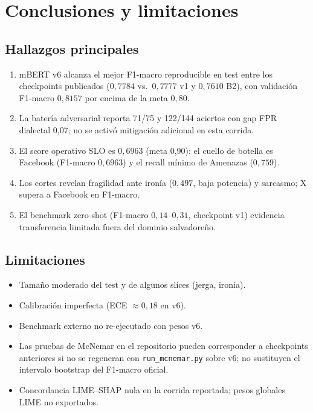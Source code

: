 \chapter{Conclusiones y limitaciones}
\label{ch:conclusiones}

\section{Hallazgos principales}

\begin{enumerate}[leftmargin=*]
  
  \item mBERT v6 alcanza el mejor F1-macro reproducible en test entre los
        checkpoints publicados ($0{,}7784$ vs.\ $0{,}7777$ v1 y $0{,}7610$ B2),
        con validación F1-macro $0{,}8157$ por encima de la meta $0{,}80$.
  \item La batería adversarial reporta 71/75 y 122/144 aciertos con gap FPR
        dialectal 0{,}07; no se activó mitigación adicional en esta corrida.
  \item El score operativo SLO es $0{,}6963$ (meta 0{,}90): el cuello de botella
        es Facebook (F1-macro $0{,}6963$) y el recall mínimo de Amenazas
        ($0{,}759$).
  \item Los cortes revelan fragilidad ante ironía ($0{,}497$, baja potencia) y
        sarcasmo; X supera a Facebook en F1-macro.
  
  
  \item El benchmark zero-shot (F1-macro $0{,}14$--$0{,}31$, checkpoint v1)
        evidencia transferencia limitada fuera del dominio salvadoreño.
\end{enumerate}

\section{Limitaciones}

\begin{itemize}[leftmargin=*]
  \item Tamaño moderado del test y de algunos slices (jerga, ironía).
  \item Calibración imperfecta (ECE $\approx 0{,}18$ en v6).
  \item Benchmark externo no re-ejecutado con pesos v6.
  \item Las pruebas de McNemar en el repositorio pueden corresponder a
        checkpoints anteriores si no se regeneran con
        \texttt{run\_mcnemar.py} sobre v6; no sustituyen el intervalo bootstrap
        del F1-macro oficial.
  \item Concordancia LIME--SHAP nula en la corrida reportada; pesos globales
        LIME no exportados.
\end{itemize}

